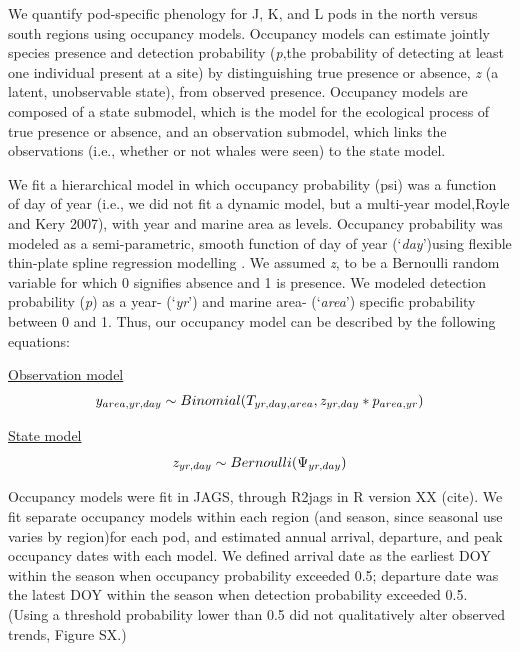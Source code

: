 \documentclass{article}
\begin{document}
\par We quantify pod-specific phenology for J, K, and L pods in the north versus south regions using occupancy models. Occupancy models can estimate jointly species presence and detection probability (\emph{p},the probability of detecting at least one individual present at a site) by distinguishing true presence or absence, \emph{z} (a latent, unobservable state), from observed presence. Occupancy models are composed of a state submodel, which is the model for the ecological process of true presence or absence, and  an observation submodel, which links the observations (i.e., whether or not whales were seen) to the state model.
\par We fit a hierarchical model in which occupancy probability (psi) was a function of day of year (i.e., we did not fit a dynamic model, but a multi-year model,Royle and Kery 2007), with year and marine area as levels. Occupancy probability was modeled as a semi-parametric, smooth function of day of year (`\emph{day}')using flexible thin-plate spline regression modelling \citep{strebel2014}. We assumed \emph{z}, to be a Bernoulli random variable for which 0 signifies absence and 1 is presence. We modeled detection probability (\emph{p}) as a year- (`\emph{yr}') and marine area- (`\emph{area}') specific probability between 0 and 1. Thus, our occupancy model can be described by the following equations:

\par \underline{Observation model}
\begin{equation} 
y_{area,yr,day} \sim Binomial (T_{yr,day,area}, z_{yr,day} * p_{area,yr})\\
\end{equation}

\par \underline{State model}
\begin{equation} 
z_{yr,day} \sim Bernoulli (\mathrm{\Psi}_{yr,day})\\
\end{equation}

\par  Occupancy models were fit in JAGS, through R2jags \citep{su2015} in R version XX (cite). We fit separate occupancy models within each region (and season, since seasonal use varies by region)for each pod, and estimated annual arrival, departure, and peak occupancy dates with each model. We defined arrival date as the earliest DOY within the season when occupancy probability exceeded 0.5; departure date was the latest DOY within the season when detection probability exceeded 0.5. (Using a threshold probability lower than 0.5 did not qualitatively alter observed trends, Figure SX.)
\end{document}
